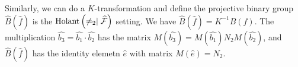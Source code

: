 Similarly, we can do a $K$-transformation and define the projective binary group $\widehat{B}(\widehat{f})$ is the $\operatorname{Holant}\left(\neq_2\mid \widehat{\mathcal{F}}\right)$ setting.
We have $\widehat{B}(\widehat{f})=K^{-1}B(f).$
The multiplication $\widehat{b_3}=\widehat{b_1}\cdot \widehat{b_2}$ has the matrix $M(\widehat{b_3})=M(\widehat{b_1})N_2M(\widehat{b_2})$, and $\widehat{B}(\widehat{f})$ has the identity elemetn $\widehat{e}$ with matrix $M(\widehat{e})=N_2.$

